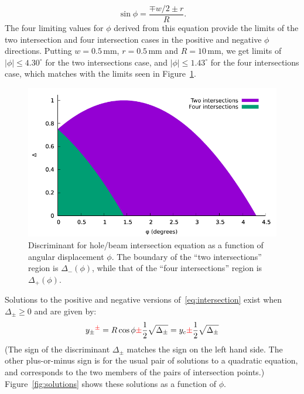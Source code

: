 \documentclass[a4paper,11pt,article]{memoir}
\begin{document}
\begin{equation*}
  \sin \phi = \frac{\mp w/2 \pm r}{R}.
\end{equation*}
The four limiting values for $\phi$ derived from this equation provide
the limits of the two intersection and four intersection cases in the
positive and negative $\phi$ directions. Putting $w =
0.5\,\mathrm{mm}$, $r = 0.5\,\mathrm{mm}$ and $R = 10\,\mathrm{mm}$,
we get limits of $|\phi| \leq 4.30^\circ$ for the two intersections
case, and $|\phi| \leq 1.43^\circ$ for the four intersections case,
which matches with the limits seen in Figure~\ref{fig:discriminant}.

\begin{figure}
  \begin{center}
    \includegraphics[width=\textwidth]{intersection-discriminant}
  \end{center}

  \caption{Discriminant for hole/beam intersection equation as a
    function of angular displacement $\phi$. The boundary of the ``two
    intersections'' region is $\Delta_{-}(\phi)$, while that of the
    ``four intersections'' region is $\Delta_{+}(\phi)$.}\label{fig:discriminant}
\end{figure}

Solutions to the positive and negative versions
of~\eqref{eq:intersection} exist when $\Delta_{\pm} \geq 0$ and are
given by:
\begin{equation}
  \label{eq:solutions}
  y_{\color{black}\pm}^{\color{red}\pm} = R \cos \phi {\color{red}\pm} \frac12
  \sqrt{\Delta_{\pm}} = y_c {\color{red}\pm} \frac12
  \sqrt{\Delta_{\pm}}
\end{equation}
(The sign of the discriminant $\Delta_{\pm}$ matches the sign on the
left hand side. The other plus-or-minus sign is for the usual pair of
solutions to a quadratic equation, and corresponds to the two members
of the pairs of intersection points.) Figure~\ref{fig:solutions} shows
these solutions as a function of $\phi$.
\end{document}
